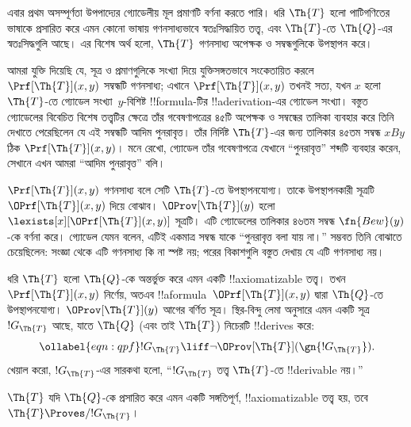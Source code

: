 \documentclass[../../../include/open-logic-section]{subfiles}
\begin{document}


এবার প্রথম অসম্পূর্ণতা উপপাদ্যের গ্যোডেলীয় মূল প্রমাণটি বর্ণনা করতে
পারি। ধরি $\Th{T}$ হলো পাটিগণিতের ভাষাকে প্রসারিত করে এমন কোনো ভাষায়
গণনসাধ্যভাবে স্বতঃসিদ্ধায়িত তত্ত্ব, এবং $\Th{T}$-তে $\Th{Q}$-এর
স্বতঃসিদ্ধগুলি আছে। এর বিশেষ অর্থ হলো, $\Th{T}$ গণনসাধ্য অপেক্ষক ও
সম্বন্ধগুলিকে উপস্থাপন করে।

আমরা যুক্তি দিয়েছি যে, সূত্র ও প্রমাণগুলিকে সংখ্যা দিয়ে যুক্তিসঙ্গতভাবে
সংকেতায়িত করলে $\Prf[\Th{T}](x,y)$ সম্বন্ধটি গণনসাধ্য; এখানে
$\Prf[\Th{T}](x,y)$ তখনই সত্য, যখন $x$ হলো $\Th{T}$-তে গ্যোডেল
সংখ্যা~$y$-বিশিষ্ট !!{formula}-টির !!a{derivation}-এর গ্যোডেল সংখ্যা।
বস্তুত গ্যোডেলের বিবেচিত বিশেষ তত্ত্বটির ক্ষেত্রে তাঁর গবেষণাপত্রের ৪৫টি
অপেক্ষক ও সম্বন্ধের তালিকা ব্যবহার করে তিনি দেখাতে পেরেছিলেন যে এই
সম্বন্ধটি আদিম পুনরাবৃত্ত। তাঁর নির্দিষ্ট $\Th{T}$-এর জন্য তালিকার ৪৫তম
সম্বন্ধ $x B y$ ঠিক $\Prf[\Th{T}](x,y)$। মনে রেখো, গ্যোডেল তাঁর
গবেষণাপত্রে যেখানে ``পুনরাবৃত্ত'' শব্দটি ব্যবহার করেন, সেখানে এখন আমরা
``আদিম পুনরাবৃত্ত'' বলি।

$\Prf[\Th{T}](x,y)$ গণনসাধ্য বলে সেটি $\Th{T}$-তে উপস্থাপনযোগ্য। তাকে
উপস্থাপনকারী সূত্রটি $\OPrf[\Th{T}](x,y)$ দিয়ে বোঝাব।
$\OProv[\Th{T}](y)$ হলো $\lexists[x][\OPrf[\Th{T}](x,y)]$ সূত্রটি।
এটি গ্যোডেলের তালিকার ৪৬তম সম্বন্ধ $\fn{Bew}(y)$-কে বর্ণনা করে। গ্যোডেল
যেমন বলেন, এটিই একমাত্র সম্বন্ধ যাকে ``পুনরাবৃত্ত বলা যায় না।'' সম্ভবত
তিনি বোঝাতে চেয়েছিলেন: সংজ্ঞা থেকে এটি গণনসাধ্য কি না স্পষ্ট নয়; পরের
বিকাশগুলি বস্তুত দেখায় যে এটি গণনসাধ্য নয়।

ধরি $\Th{T}$ হলো $\Th{Q}$-কে অন্তর্ভুক্ত করে এমন একটি
!!{axiomatizable} তত্ত্ব। তখন $\Prf[\Th{T}](x, y)$ নির্ণেয়, অতএব
!!a{formula}~$\OPrf[\Th{T}](x, y)$ দ্বারা $\Th{Q}$-তে উপস্থাপনযোগ্য।
$\OProv[\Th{T}](y)$ আগের বর্ণিত সূত্র। স্থির-বিন্দু লেমা অনুসারে এমন একটি
সূত্র $!G_\Th{T}$ আছে, যাতে $\Th{Q}$ (এবং তাই $\Th{T}$) নিচেরটি
!!{derive}s করে:
\begin{equation}
\ollabel{eqn:qpf}
!G_\Th{T} \liff \lnot \OProv[\Th{T}](\gn{!G_\Th{T}}).
\end{equation}
খেয়াল করো, $!G_\Th{T}$-এর সারকথা হলো, ``$!G_\Th{T}$ তত্ত্ব
$\Th{T}$-তে !!{derivable} নয়।''

\begin{lem}
$\Th{T}$ যদি $\Th{Q}$-কে প্রসারিত করে এমন একটি সঙ্গতিপূর্ণ,
!!{axiomatizable} তত্ত্ব হয়, তবে $\Th{T} \Proves/ !G_\Th{T}$।
\end{lem}
\end{document}

